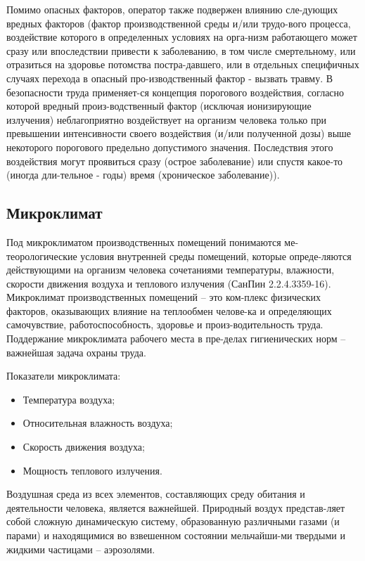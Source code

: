 \clearpage
Помимо опасных факторов, оператор также подвержен влиянию сле-дующих вредных факторов (фактор производственной среды и/или трудо-вого процесса, воздействие которого в определенных условиях на орга-низм работающего может сразу или впоследствии привести к заболеванию, в том числе смертельному, или отразиться на здоровье потомства постра-давшего, или в отдельных специфичных случаях перехода в опасный про-изводственный фактор - вызвать травму. В безопасности труда применяет-ся концепция порогового воздействия, согласно которой вредный произ-водственный фактор (исключая ионизирующие излучения) неблагоприятно воздействует на организм человека только при превышении интенсивности своего воздействия (и/или полученной дозы) выше некоторого порогового предельно допустимого значения. Последствия этого воздействия могут проявиться сразу (острое заболевание) или спустя какое-то (иногда дли-тельное - годы) время (хроническое заболевание)).

\subsection{Микроклимат}
Под микроклиматом производственных помещений понимаются ме-теорологические условия внутренней среды помещений, которые опреде-ляются действующими на организм человека сочетаниями температуры, влажности, скорости движения воздуха и теплового излучения (СанПин 2.2.4.3359-16). Микроклимат производственных помещений – это ком-плекс физических факторов, оказывающих влияние на теплообмен челове-ка и определяющих самочувствие, работоспособность, здоровье и произ-водительность труда. Поддержание микроклимата рабочего места в пре-делах гигиенических норм – важнейшая задача охраны труда.

Показатели микроклимата:
\begin{itemize}
	\item Температура воздуха;
	\item Относительная влажность воздуха;
	\item Скорость движения воздуха;
	\item Мощность теплового излучения.
\end{itemize}

Воздушная среда из всех элементов, составляющих среду обитания и деятельности человека, является важнейшей. Природный воздух представ-ляет собой сложную динамическую систему, образованную различными газами (и парами) и находящимися во взвешенном состоянии мельчайши-ми твердыми и жидкими частицами – аэрозолями.

